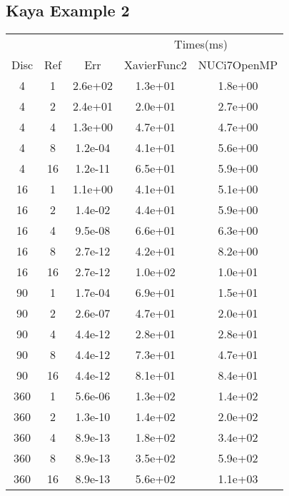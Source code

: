 \subsection{Kaya Example 2}
\begin{center}
  \begin{tabular}{c|c|c|c|c}
      &&&\multicolumn{2}{|c}{Times(ms)}\\
    Disc&Ref&Err&XavierFunc2&NUCi7OpenMP\\
    \hline
    4&1&2.6e+02&1.3e+01&1.8e+00\\
    4&2&2.4e+01&2.0e+01&2.7e+00\\
    4&4&1.3e+00&4.7e+01&4.7e+00\\
    4&8&1.2e-04&4.1e+01&5.6e+00\\
    4&16&1.2e-11&6.5e+01&5.9e+00\\
    \hline
    16&1&1.1e+00&4.1e+01&5.1e+00\\
    16&2&1.4e-02&4.4e+01&5.9e+00\\
    16&4&9.5e-08&6.6e+01&6.3e+00\\
    16&8&2.7e-12&4.2e+01&8.2e+00\\
    16&16&2.7e-12&1.0e+02&1.0e+01\\
    \hline
    90&1&1.7e-04&6.9e+01&1.5e+01\\
    90&2&2.6e-07&4.7e+01&2.0e+01\\
    90&4&4.4e-12&2.8e+01&2.8e+01\\
    90&8&4.4e-12&7.3e+01&4.7e+01\\
    90&16&4.4e-12&8.1e+01&8.4e+01\\
    \hline
    360&1&5.6e-06&1.3e+02&1.4e+02\\
    360&2&1.3e-10&1.4e+02&2.0e+02\\
    360&4&8.9e-13&1.8e+02&3.4e+02\\
    360&8&8.9e-13&3.5e+02&5.9e+02\\
    360&16&8.9e-13&5.6e+02&1.1e+03\\
    \hline
  \end{tabular}
\end{center}







